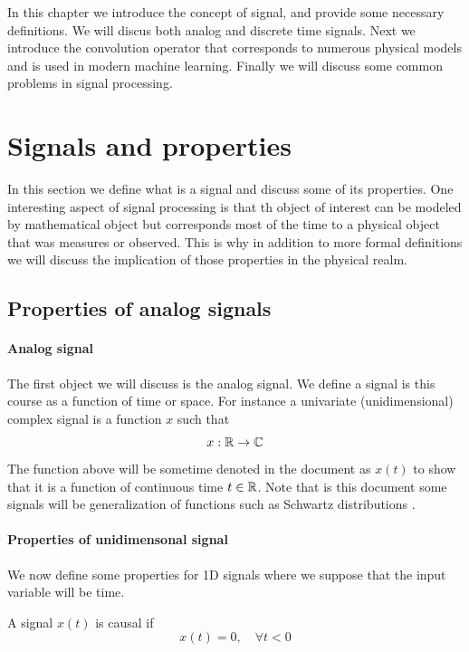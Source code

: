 

In this chapter we introduce the concept of signal, and provide some necessary
definitions. We will discus both analog and discrete time signals.
Next we introduce the convolution operator that corresponds to
numerous physical models and is used in modern machine learning. Finally we will
discuss some common problems in signal processing.

\section{Signals and properties}

In this section we define what is a signal and discuss some of its properties.
One interesting aspect of signal processing is that th object of interest can be
modeled by mathematical object but corresponds most of the time to a physical
object that was measures or observed. This is why in addition to more formal
definitions we will discuss the implication of those properties in the physical realm.

\subsection{Properties of analog signals}

\paragraph{Analog signal} The first object we will discuss is the analog signal.
We define a signal is this course as a function of time or space. For instance a
univariate (unidimensional) complex signal is a function $x$ such that
$$x:\mathbb{R}\rightarrow\mathbb{C}$$
The function above will be sometime denoted in the document as $x(t)$ to show
that it is a function of continuous time $t\in\mathbb{R}$. 
Note that is this document some signals
will be generalization of functions such as Schwartz distributions \cite{schwartz1951theorie}. 




\paragraph{Properties of unidimensonal signal} We now define some properties for
1D signals where we suppose that the input variable will be time.

\begin{definition}[Causality]
  A signal $x(t)$ is causal if 
$$ x(t)=0,\quad \forall t<0 $$
\end{definition}

